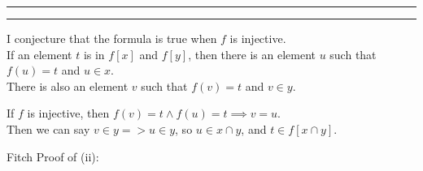 \documentclass[11pt,letterpaper]{article}
\newcommand{\question}[1] {\vspace{.25in} \hrule\vspace{0.5em}
\noindent{\bf #1} \vspace{0.5em}
\hrule \vspace{.10in}}
\begin{document}
\question{2.iii}
I conjecture that the formula is true when $f$ is injective.\\

If an element $t$ is in $f[x]$ and $f[y]$, then there is an element $u$ such that $f(u) = t$ and $u \in x$.\\
There is also an element $v$ such that $f(v) = t$ and $v \in y$.

If $f$ is injective, then $f(v) = t \wedge f(u) = t \implies v = u$.\\
Then we can say $v \in y => u \in y$, so $u \in x \cap y$, and $t \in f[x \cap y]$.

Fitch Proof of (ii):\\
\end{document}
